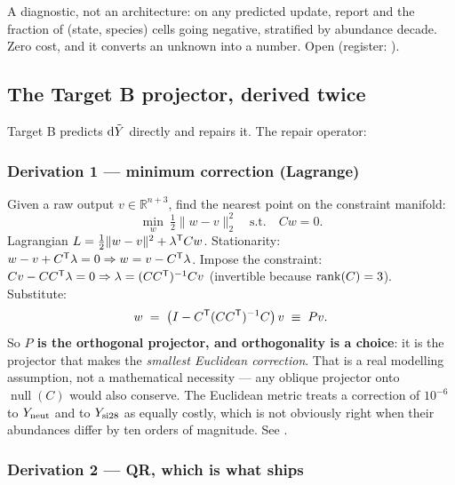 A diagnostic, not an architecture: on any predicted update, report
 and the fraction of (state, species) cells going
negative, stratified by abundance decade. Zero cost, and it converts an unknown
into a number. Open (register: ).

\subsection{The Target B projector, derived twice}
\label{sec:projector}

Target B predicts $\mathrm{d}\tilde Y$ directly and repairs it. The repair operator:

\subsubsection{Derivation 1 --- minimum correction (Lagrange)}
\label{sec:projlagrange}

Given a raw output $v \in \mathbb{R}^{n+3}$, find the nearest point on the
constraint manifold:
%
\begin{equation}
\min_{w}\ \tfrac12\|w - v\|_2^2 \quad\text{s.t.}\quad Cw = 0 .
\label{eq:projmin}
\end{equation}
%
Lagrangian $L = \tfrac12\|w-v\|^2 + \lambda^{\mathsf{T}} Cw$. Stationarity:
$w - v + C^{\mathsf{T}}\lambda = 0 \Rightarrow w = v - C^{\mathsf{T}}\lambda$. Impose the
constraint: $Cv - CC^{\mathsf{T}}\lambda = 0 \Rightarrow \lambda = (CC^{\mathsf{T}})^{-1}Cv$
(invertible because $\operatorname{rank}(C) = 3$). Substitute:
%
\begin{equation}
w \;=\; \bigl(I - C^{\mathsf{T}}(CC^{\mathsf{T}})^{-1}C\bigr)\,v \;\equiv\; P v .
\label{eq:projector}
\end{equation}
%
So \textbf{$P$ is the orthogonal projector, and orthogonality is a choice}: it
is the projector that makes the \emph{smallest Euclidean correction}. That is a
real modelling assumption, not a mathematical necessity --- any oblique
projector onto $\operatorname{null}(C)$ would also conserve. The Euclidean
metric treats a correction of $10^{-6}$ to $Y_{\rm neut}$ and to $Y_{\rm si28}$
as equally costly, which is not obviously right when their abundances differ by
ten orders of magnitude. See .

\subsubsection{Derivation 2 --- QR, which is what ships}
\label{sec:projqr}

